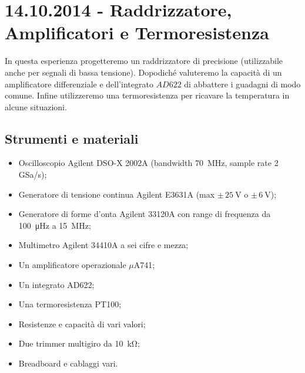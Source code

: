 \section{14.10.2014 - Raddrizzatore, Amplificatori e Termoresistenza}

In questa esperienza progetteremo un raddrizzatore di precisione (utilizzabile anche per segnali di bassa tensione). Dopodiché valuteremo la capacità di un amplificatore differenziale e dell'integrato $AD622$ di abbattere i guadagni di modo comune. Infine utilizzeremo una termoresistenza per ricavare la temperatura in alcune situazioni.

\subsection*{Strumenti e materiali}

\begin{itemize} [noitemsep]
\item Oscilloscopio Agilent DSO-X 2002A (bandwidth \SI{70}{\mega\hertz}, sample rate \num{2} GSa/s);
\item Generatore di tensione continua Agilent E3631A (max $\pm \, \SI{25}{\volt}$ o $\pm \, \SI{6}{\volt}$);
\item Generatore di forme d'onta Agilent 33120A con range di frequenza da \SI{100}{\micro\hertz} a \SI{15}{\mega\hertz};
\item Multimetro Agilent 34410A a sei cifre e mezza;
\item Un amplificatore operazionale $\mu$A741;
\item Un integrato AD622;
\item Una termoresistenza PT100;
\item Resistenze e capacità di vari valori;
\item Due trimmer multigiro da \SI{10}{\kilo\ohm};
\item Breadboard e cablaggi vari.
\end{itemize}
